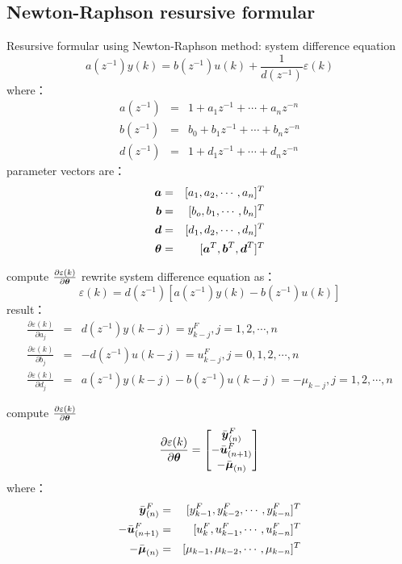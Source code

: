 \subsection{Newton-Raphson resursive formular}

\begin{frame}{Resursive formular using Newton-Raphson method: system difference equation}
$$
a(z^{-1})y(k) = b(z^{-1})u(k)+\frac{1}{d(z^{-1})}\varepsilon(k)
$$
where：
\begin{eqnarray*}
a(z^{-1}) &=&  1+a_1 z^{-1}+\cdots+a_nz^{-n} \\
b(z^{-1}) &=&  b_0+b_1 z^{-1}+\cdots+b_n z^{-n} \\
d(z^{-1}) &=&  1+d_1 z^{-1}+\cdots+d_n z^{-n} 
\end{eqnarray*}
parameter vectors are：
\begin{eqnarray*}
\boldsymbol{a} &=& [a_1,a_2,\cdots,a_n]^T   \\
\boldsymbol{b} &=& [b_o,b_1,\cdots,b_n]^T   \\
\boldsymbol{d} &=& [d_1,d_2,\cdots,d_n]^T   \\
\boldsymbol{\theta} &=& [\boldsymbol{a}^T,\boldsymbol{b}^T,\boldsymbol{d}^T]^T
\end{eqnarray*}
\end{frame}

\begin{frame}{compute $\frac{\partial\varepsilon(k)}{\partial\boldsymbol{\theta}}$}
rewrite system difference equation as：
$$
\varepsilon(k) = d(z^{-1})[a(z^{-1})y(k)-b(z^{-1})u(k)]
$$
result：
\begin{eqnarray*}
\frac{\partial\varepsilon(k)}{\partial a_j} &=& d(z^{-1})y(k-j)=y^F_{k-j},j=1,2,\cdots,n\\
\frac{\partial\varepsilon(k)}{\partial b_j} &=& -d(z^{-1})u(k-j)=u^F_{k-j},j=0,1,2,\cdots,n\\
\frac{\partial\varepsilon(k)}{\partial d_j} &=& a(z^{-1})y(k-j)-b(z^{-1})u(k-j)=-\mu_{k-j},j=1,2,\cdots,n 
\end{eqnarray*}
\end{frame}

\begin{frame}{compute $\frac{\partial\varepsilon(k)}{\partial\boldsymbol{\theta}}$}
$$
\frac{\partial\varepsilon(k)}{\partial\boldsymbol{\theta}} = 
\begin{bmatrix}
\bar{\boldsymbol{y}}^F_{(n)} \\
-\bar{\boldsymbol{u}}^F_{(n+1)} \\
-\bar{\boldsymbol{\mu}}_{(n)}
\end{bmatrix}
$$
where：
\begin{eqnarray*}
\bar{\boldsymbol{y}}^F_{(n)} &=& [y^F_{k-1}, y^F_{k-2}, \cdots , y^F_{k-n}]^T \\
-\bar{\boldsymbol{u}}^F_{(n+1)} &=& [u^F_k,  u^F_{k-1},\cdots, u^F_{k-n}]^T  \\
-\bar{\boldsymbol{\mu}}_{(n)}  &=& [\mu_{k-1},\mu_{k-2},\cdots, \mu_{k-n}]^T
\end{eqnarray*}
\end{frame}

